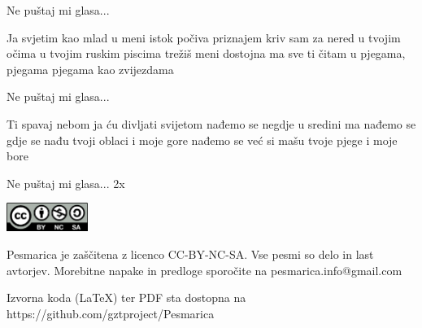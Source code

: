 \documentclass[a4paper,12pt]{article}
\begin{document}
\begin{multicols}{2}
\begin{guitar}
Ne puštaj mi glasa...


Ja svjetim kao mlad 
u meni istok počiva
priznajem kriv sam za nered u tvojim očima
u tvojim ruskim piscima trežiš meni dostojna
ma sve ti čitam u pjegama, pjegama
pjegama kao zvijezdama


Ne puštaj mi glasa...


Ti spavaj nebom ja ću divljati svijetom
nađemo se negdje u sredini
ma nađemo se gdje se nađu
tvoji oblaci i moje gore
nađemo se već si mašu
tvoje pjege i moje bore


Ne puštaj mi glasa... 2x

\end{guitar}
\end{multicols}
\clearpage
\clearpage
\null
\vfill
\center
\includegraphics[width=100px]{img/licence.png}

Pesmarica je zaščitena z licenco CC-BY-NC-SA. Vse pesmi so delo in last avtorjev. Morebitne napake in predloge sporočite na pesmarica.info@gmail.com 

Izvorna koda (LaTeX) ter PDF sta dostopna na https://github.com/gztproject/Pesmarica
\end{document}
